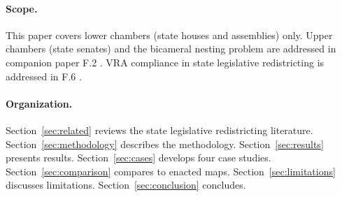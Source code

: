 \paragraph{Scope.}
This paper covers lower chambers (state houses and assemblies) only.
Upper chambers (state senates) and the bicameral nesting problem are
addressed in companion paper F.2 \citep{dellaLibera2026bicameral}.
VRA compliance in state legislative redistricting is addressed in F.6
\citep{dellaLibera2026vraStateLeg}.

\paragraph{Organization.}
Section~\ref{sec:related} reviews the state legislative redistricting
literature. Section~\ref{sec:methodology} describes the methodology.
Section~\ref{sec:results} presents results. Section~\ref{sec:cases}
develops four case studies. Section~\ref{sec:comparison} compares to
enacted maps. Section~\ref{sec:limitations} discusses limitations.
Section~\ref{sec:conclusion} concludes.
